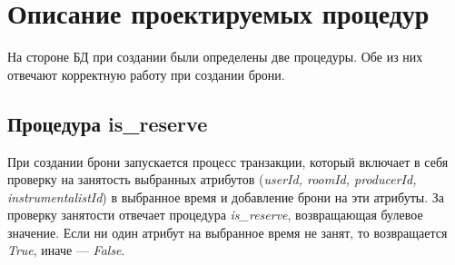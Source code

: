 \section{Описание проектируемых процедур}

На стороне БД при создании были определены две процедуры. Обе из них отвечают корректную работу при создании брони.

\subsection{Процедура is\_reserve}
При создании брони запускается процесс транзакции, который включает в себя проверку на занятость выбранных атрибутов (\textit{userId, roomId, producerId, instrumentalistId}) в выбранное время и добавление брони на эти атрибуты.
За проверку занятости отвечает процедура \textit{is\_reserve}, возвращающая булевое значение.
Если ни один атрибут на выбранное время не занят, то возвращается \textit{True}, иначе --- \textit{False}.

